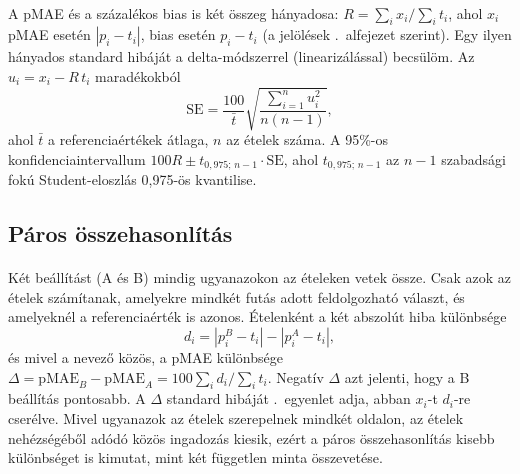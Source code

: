 \paragraph{}A pMAE és a százalékos bias is két összeg hányadosa:
$R = \sum_i x_i / \sum_i t_i$, ahol $x_i$ pMAE esetén $|p_i - t_i|$, bias esetén 
$p_i - t_i$ (a jelölések \az{\ref{sec:hibamertekek}}.~alfejezet szerint). Egy ilyen 
hányados standard hibáját a delta-módszerrel (linearizálással) becsülöm. Az 
$u_i = x_i - R\,t_i$ maradékokból
\begin{equation}
  \label{eq:se_arany}
  \mathrm{SE} = \frac{100}{\bar{t}}\sqrt{\frac{\sum_{i=1}^{n} u_i^2}{n(n-1)}},
\end{equation}
ahol $\bar{t}$ a referenciaértékek átlaga, $n$ az ételek száma. A 95\%-os 
konfidenciaintervallum $100R \pm t_{0{,}975;\,n-1}\cdot\mathrm{SE}$, ahol 
$t_{0{,}975;\,n-1}$ az $n-1$ szabadsági fokú Student-eloszlás 
0,975-ös kvantilise.

\subsection{Páros összehasonlítás}
\paragraph{}Két beállítást (A és B) mindig ugyanazokon az ételeken vetek össze. 
Csak azok az ételek számítanak, amelyekre mindkét futás adott feldolgozható 
választ, és amelyeknél a referenciaérték is azonos. Ételenként a két abszolút 
hiba különbsége
\begin{equation}
  d_i = |p_i^{B} - t_i| - |p_i^{A} - t_i|,
\end{equation}
és mivel a nevező közös, a pMAE különbsége
$\Delta = \mathrm{pMAE}_B - \mathrm{pMAE}_A = 100\sum_i d_i / \sum_i t_i$. 
Negatív $\Delta$ azt jelenti, hogy a B beállítás pontosabb. A $\Delta$ standard hibáját \az{\ref{eq:se_arany}}.~egyenlet adja,
 abban $x_i$-t $d_i$-re cserélve. Mivel ugyanazok az 
ételek szerepelnek mindkét oldalon, az ételek nehézségéből adódó közös 
ingadozás kiesik, ezért a páros összehasonlítás kisebb különbséget is 
kimutat, mint két független minta összevetése.

